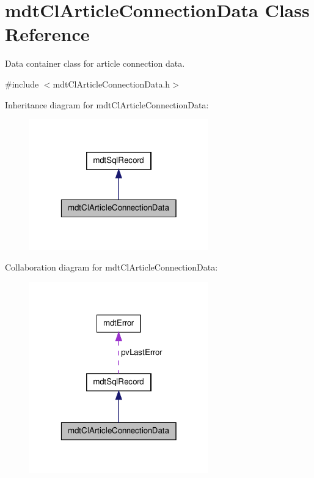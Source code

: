 \hypertarget{classmdt_cl_article_connection_data}{\section{mdt\-Cl\-Article\-Connection\-Data Class Reference}
\label{classmdt_cl_article_connection_data}
}


Data container class for article connection data.  




{\ttfamily \#include $<$mdt\-Cl\-Article\-Connection\-Data.\-h$>$}



Inheritance diagram for mdt\-Cl\-Article\-Connection\-Data\-:\nopagebreak
\begin{figure}[H]
\begin{center}
\leavevmode
\includegraphics[width=220pt]{classmdt_cl_article_connection_data__inherit__graph}
\end{center}
\end{figure}


Collaboration diagram for mdt\-Cl\-Article\-Connection\-Data\-:\nopagebreak
\begin{figure}[H]
\begin{center}
\leavevmode
\includegraphics[width=220pt]{classmdt_cl_article_connection_data__coll__graph}
\end{center}
\end{figure}
